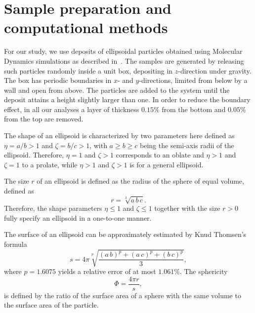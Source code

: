 \documentclass[aps,twocolumn,superscriptaddress,showpacs,showkeys]{revtex4-1}
\begin{document}
\section{Sample preparation and computational methods}
\label{sec:simulations}
For our study, we use deposits of ellipsoidal particles obtained using
Molecular Dynamics simulations as described in~\cite{bib:reza-pedro2011}. The
samples are generated by releasing such particles randomly inside a unit box,
depositing in $z$-direction under gravity. The box has periodic boundaries in
$x$- and $y$-directions, limited from below by a wall and open from above. The
particles are added to the system until the deposit attains a height slightly
larger than one. In order to reduce the boundary effect, in all our analyses a
layer of thickness $0.15\%$ from the bottom and $0.05\%$ from the top are
removed.

The shape of an ellipsoid is characterized by two parameters here defined as
$\eta = a/b > 1$ and $\zeta = b/c > 1$, with $a \ge b \ge c$ being the
semi-axis radii of the ellipsoid. Therefore, $\eta=1$ and $\zeta>1$
corresponds to an oblate and $\eta>1$ and $\zeta=1$ to a prolate, while
$\eta>1$ and $\zeta>1$ is for a general ellipsoid.

The size $r$ of an ellipsoid is defined as the radius of the sphere of equal
volume, defined as
%
\begin{equation}
\label{eq:radius}
  r = \sqrt[3]{a\,b\,c}.
\end{equation}
%
Therefore, the shape parameters $\eta \le 1$ and $\zeta \le 1$
together with the size $r>0$ fully specify an ellipsoid in a one-to-one
manner.

The surface of an ellipsoid can be approximately estimated by Knud Thomsen's
formula
%
\begin{equation}
\label{eq:surface}
 s = 4\pi\sqrt[p]{ \frac{ (a\,b)^{p} + (a\,c)^{p} + (b\,c)^{p} }{3} },
\end{equation}
%
where $p=1.6075$ yields a relative error of at most $1.061\%$. The sphericity
%
\begin{equation}
\label{eq:sphericity}
 \Phi = \frac{4\pi r}{s},
\end{equation}
%
is defined by the ratio of the surface area of a sphere with the same volume to
the surface area of the particle.
 
\end{document}
